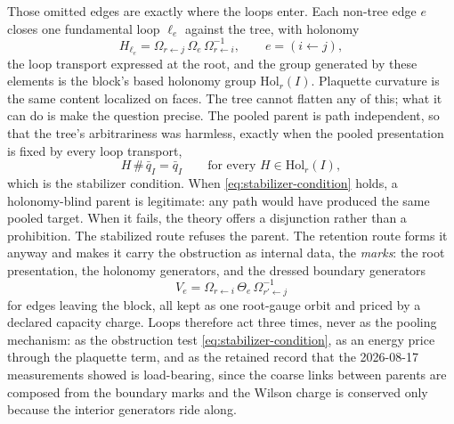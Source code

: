 \documentclass[11pt,letterpaper]{article}
\begin{document}
Those omitted edges are exactly where the loops enter. Each non-tree edge $e$ closes one
fundamental loop $\ell_e$ against the tree, with holonomy
\begin{equation}
  H_{\ell_e}=\Omega_{r\leftarrow j}\,\Omega_e\,\Omega_{r\leftarrow i}^{-1},
  \qquad e=(i\!\leftarrow\!j),
  \label{eq:loop-holonomy}
\end{equation}
the loop transport expressed at the root, and the group generated by these elements is the
block's based holonomy group $\mathrm{Hol}_r(I)$. Plaquette curvature is the same content
localized on faces. The tree cannot flatten any of this; what it can do is make the question
precise. The pooled parent is path independent, so that the tree's arbitrariness was harmless,
exactly when the pooled presentation is fixed by every loop transport,
\begin{equation}
  H\,\#\,\bar q_I=\bar q_I
  \qquad\text{for every } H\in\mathrm{Hol}_r(I),
  \label{eq:stabilizer-condition}
\end{equation}
which is the stabilizer condition. When \eqref{eq:stabilizer-condition} holds, a holonomy-blind
parent is legitimate: any path would have produced the same pooled target. When it fails, the
theory offers a disjunction rather than a prohibition. The stabilized route refuses the parent.
The retention route forms it anyway and makes it carry the obstruction as internal data, the
\emph{marks}: the root presentation, the holonomy generators, and the dressed boundary
generators
\begin{equation}
  V_e=\Omega_{r\leftarrow i}\,\Theta_e\,\Omega_{r'\leftarrow j}^{-1}
  \label{eq:dressed-boundary}
\end{equation}
for edges leaving the block, all kept as one root-gauge orbit and priced by a declared capacity
charge. Loops therefore act three times, never as the pooling mechanism: as the obstruction test
\eqref{eq:stabilizer-condition}, as an energy price through the plaquette term, and as the
retained record that the 2026-08-17 measurements showed is load-bearing, since the coarse links
between parents are composed from the boundary marks and the Wilson charge is conserved only
because the interior generators ride along.
\end{document}
